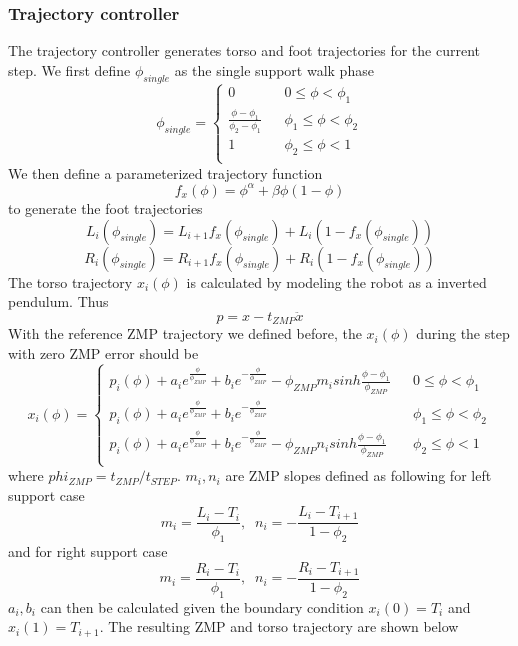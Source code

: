 \documentclass{article}
\begin{document}
\subsubsection{Trajectory controller}
The trajectory controller generates torso and foot trajectories for the current step. We first define $\phi_{single}$ as the single support walk phase
$$ \phi_{single}=\left\{
\begin{array}{rcl}
0 & & 0 \leq \phi < \phi_1\\
\frac{\phi-\phi_1}{\phi_2-\phi_1} & & \phi_1 \leq \phi < \phi_2\\
1 & & \phi_2 \leq \phi < 1\\
\end{array} \right. $$
We then define a parameterized trajectory function
$$f_x(\phi)=\phi^{\alpha}+\beta \phi(1-\phi)$$
to generate the foot trajectories
$$L_i(\phi_{single})=L_{i+1}f_x(\phi_{single})+L_i(1-f_x(\phi_{single}))$$
$$R_i(\phi_{single})=R_{i+1}f_x(\phi_{single})+R_i(1-f_x(\phi_{single}))$$
The torso trajectory $x_i(\phi)$ is calculated by modeling the robot as a inverted pendulum. Thus
$$p=x-t_{ZMP}\ddot x$$
With the reference ZMP trajectory we defined before, the $x_i(\phi)$ during the step with zero ZMP error should be
$$ x_i(\phi)=\left\{
\begin{array}{rcl}
p_i(\phi)+a_i e^{\frac{\phi}{\phi_{ZMP}}}+b_i e^{-\frac{\phi}{\phi_{ZMP}}}-\phi_{ZMP}m_i sinh \frac{\phi-\phi_1}{\phi_{ZMP}}& & 0 \leq \phi < \phi_1\\
p_i(\phi)+a_i e^{\frac{\phi}{\phi_{ZMP}}}+b_i e^{-\frac{\phi}{\phi_{ZMP}}} & & \phi_1 \leq \phi < \phi_2\\
p_i(\phi)+a_i e^{\frac{\phi}{\phi_{ZMP}}}+b_i e^{-\frac{\phi}{\phi_{ZMP}}}-\phi_{ZMP}n_i sinh \frac{\phi-\phi_1}{\phi_{ZMP}} & & \phi_2 \leq \phi < 1\\
\end{array} \right. $$
where $phi_{ZMP}=t_{ZMP}/t_{STEP}$. $m_i,n_i$ are ZMP slopes defined as following for left support case
$$m_i=\frac{L_i-T_i}{\phi_1},\;\;n_i=-\frac{L_i-T_{i+1}}{1-\phi_2}$$
and for right support case
$$m_i=\frac{R_i-T_i}{\phi_1},\;\;n_i=-\frac{R_i-T_{i+1}}{1-\phi_2}$$
$a_i,b_i$ can then be calculated given the boundary condition $x_i(0)=T_i$ and $x_i(1)=T_{i+1}$. The resulting ZMP and torso trajectory are shown below
\end{document}
